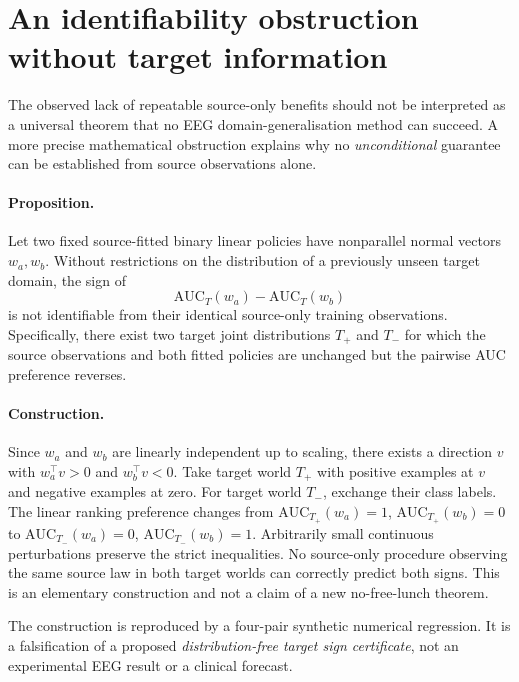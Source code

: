 \section{An identifiability obstruction without target information}
\label{sec:p3-source-identifiability}
The observed lack of repeatable source-only benefits should
not be interpreted as a universal theorem that no EEG
domain-generalisation method can succeed. A more precise
mathematical obstruction explains why no \emph{unconditional}
guarantee can be established from source observations
alone.

\paragraph{Proposition.}
Let two fixed source-fitted binary linear policies
have nonparallel normal vectors $w_a,w_b$.
Without restrictions on the distribution of a
previously unseen target domain, the sign of
\[
 \mathrm{AUC}_{T}(w_a)-\mathrm{AUC}_{T}(w_b)
\]
is not identifiable from their identical source-only
training observations. Specifically, there exist
two target joint distributions $T_+$ and $T_-$
for which the source observations and both
fitted policies are unchanged but the pairwise
AUC preference reverses.

\paragraph{Construction.}
Since $w_a$ and $w_b$ are linearly independent
up to scaling, there exists a direction $v$
with $w_a^\top v>0$ and $w_b^\top v<0$.
Take target world $T_+$ with positive examples
at $v$ and negative examples at zero.
For target world $T_-$, exchange their
class labels. The linear ranking preference
changes from
$\mathrm{AUC}_{T_+}(w_a)=1$,
$\mathrm{AUC}_{T_+}(w_b)=0$ to
$\mathrm{AUC}_{T_-}(w_a)=0$,
$\mathrm{AUC}_{T_-}(w_b)=1$.
Arbitrarily small continuous perturbations
preserve the strict inequalities.
No source-only procedure observing the
same source law in both target worlds
can correctly predict both signs.
This is an elementary construction and
not a claim of a new no-free-lunch theorem.

The construction is reproduced by a
four-pair synthetic numerical regression.
It is a falsification of a proposed
\emph{distribution-free target sign
certificate}, not an experimental EEG result
or a clinical forecast.

